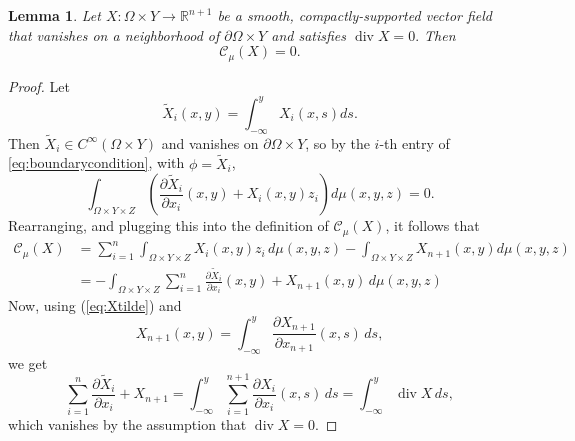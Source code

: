 \documentclass{article}
\newcommand{\R}{\mathbb{R}}
\newtheorem{lemma}[theorem]{Lemma}
\theoremstyle{definition}
\theoremstyle{remark}
\begin{document}
\begin{lemma}\label{lem:divergencecond}
Let $X\colon\Omega\times Y\to\R^{n+1}$ be a smooth, compactly-supported vector field  that vanishes on a neighborhood of $\partial \Omega\times Y$ and satisfies
$\operatorname{div} X=0.$
Then
%
%
%
%
%
\[{\mathcal C_\mu}(X)=0.\]
\end{lemma}
\begin{proof} 
Let 
\begin{equation}\label{eq:Xtilde}
\tilde X_i(x,y)=\int_{-\infty}^yX_i(x,s)ds.
\end{equation}
%
%
%
Then $%
\tilde X_i\in C^\infty%
(\Omega\times Y)$ and vanishes on $\partial\Omega\times Y$, so by the $i$-th entry of \eqref{eq:boundarycondition}, with $\phi=%
\tilde X_i$,%
%
\[
%
%
\int_{\Omega\times Y\times Z}\left(\frac{\partial\tilde X_i}{\partial x_i}(x,y) +X_i(x,y)z_i\right) d\mu(x,y,z)%
%
=0.
\]%
Rearranging, and plugging this into the definition of ${\mathcal C_\mu}(X)$, it follows that
%
%
\begin{align*}
 {\mathcal C_\mu}(X)&=\sum_{i=1}^n\int_{\Omega\times Y\times Z}X_i(x,y)z_i\,d\mu(x,y,z)-\int_{\Omega\times Y\times Z}X_{n+1}(x,y)d\mu(x,y,z)\\
 &=- %
 \int_{ \Omega\times Y\times Z}\sum_{i=1}^{n}\frac{\partial\tilde X_i}{\partial x_i}(x,y)%
 +X_{n+1}(x,y)\,d\mu(x,y,z)
\end{align*}
Now, using (\ref{eq:Xtilde}) and 
\[X_{n+1}(x,y)=\int_{-\infty}^y\frac{\partial X_{n+1}}{\partial x_{n+1}}(x,s)\,ds,\] 
we get
\begin{equation*}
 \sum_{i=1}^n\frac{\partial\tilde X_i}{\partial x_i}+X_{n+1}
%
%
= \int_{-\infty}^{y} \sum_{i=1}^{n+1}\frac{\partial X_i}{\partial x_i}(x,s)\,ds=\int_{-\infty}^{y}\operatorname{div} X\,ds, %
\end{equation*}
%
which vanishes by the assumption that $\operatorname{div} X = 0$. 
\qedhere
\end{proof}
%
%
\end{document}
